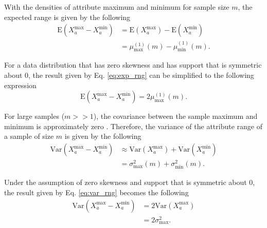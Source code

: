 \documentclass[10pt,letterpaper]{article}\usepackage[]{graphicx}\usepackage[]{color}
\begin{document}
With the densities of attribute maximum and minimum for sample size $m$, the expected range is given by the following
%
\begin{equation}\label{eq:exp_rng}
\begin{aligned}
\text{E}(X^\text{max}_a - X^\text{min}_a) &= \text{E}(X^\text{max}_a) - \text{E}(X^\text{min}_a) \\
&= \mu^{(1)}_\text{max}(m) - \mu^{(1)}_\text{min}(m).
\end{aligned}
\end{equation}

For a data distribution that has zero skewness and has support that is symmetric about 0, the result given by Eq. \ref{eq:exp_rng} can be simplified to the following expression
%
\begin{equation}\label{eq:exp_rng_symm}
\text{E}(X^\text{max}_a - X^\text{min}_a) = 2 \mu^{(1)}_\text{max}(m).
\end{equation}

For large samples ($m >> 1$), the covariance between the sample maximum and minimum is approximately zero \cite{gumbel1947}. Therefore, the variance of the attribute range of a sample of size $m$ is given by the following
%
\begin{equation}\label{eq:var_rng}
\begin{aligned}
\text{Var}(X^\text{max}_a - X^\text{min}_a) &\approx \text{Var}(X^\text{max}_a) + \text{Var}(X^\text{min}_a) \\
&= \sigma^2_\text{max}(m) + \sigma^2_\text{min}(m).
\end{aligned}
\end{equation}

Under the assumption of zero skewness and support that is symmetric about 0, the result given by Eq. \ref{eq:var_rng} becomes the following
%
\begin{equation}\label{eq:var_rng_symm}
\begin{aligned}
\text{Var}(X^\text{max}_a - X^\text{min}_a) &= 2 \text{Var}(X^\text{max}_a) \\
&= 2 \sigma^2_\text{max}.
\end{aligned}
\end{equation}
\end{document}
